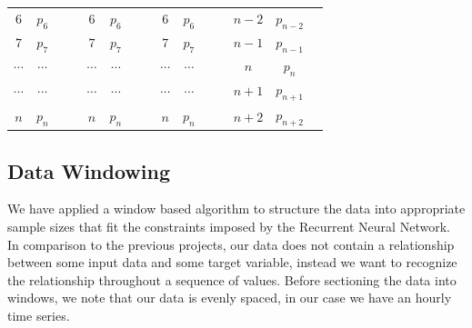 \documentclass
[twocolumn,
secnumarabic,
nobibnotes,
aps,
prl,
reprint,
groupedaddress,
amsmath,
amssymb,
]{revtex4-2}
\begin{document}
\begin{center}
\begin{tabular}{|c|c|cc|c|c|cc|c|c|cc|c|c|c}
    $6$        & $p_6$                         &                &  & $6$        & \cellcolor[HTML]{A2E4F6}$p_6$ &                &  & $6$        & \cellcolor[HTML]{A2E4F6}$p_6$ &       &  & ${n-2}$    & \cellcolor[HTML]{C0C0C0}$p_{n-2}$ &       \\ \cline{1-2} \cline{5-6} \cline{9-10} \cline{13-14}
    $7$        & $p_7$                         &                &  & $7$        & $p_7$                         &                &  & $7$        & \cellcolor[HTML]{A2E4F6}$p_7$ &                &  & ${n-1}$    & \cellcolor[HTML]{C0C0C0}$p_{n-1}$ &                \\ \cline{1-2} \cline{5-6} \cline{9-10} \cline{13-14}
    $\cdots$            & $\cdots$                             &                &  & $\cdots$            & $\cdots$                             &                &  & $\cdots$            & $\cdots$                             &                &  & ${n}$    & \cellcolor[HTML]{C0C0C0}$p_{n}$ &       \\ \cline{1-2} \cline{5-6} \cline{9-10} \cline{13-14}
    $\cdots$            & $\cdots$                             &                &  & $\cdots$            & $\cdots$                             &                &  & $\cdots$            & $\cdots$                             &                &  & ${n+1}$    & \cellcolor[HTML]{A2E4F6}$p_{n+1}$ &  \\ \cline{1-2} \cline{5-6} \cline{9-10} \cline{13-14}
    $n$        & $p_n$                         &                &  & $n$        & $p_n$                         &                &  & $n$        & $p_n$                         &                &  & $n+2$        & \cellcolor[HTML]{A2E4F6}$p_{n+2}$     &                \\ \cline{1-2} \cline{5-6} \cline{9-10} \cline{13-14}
  \end{tabular}
\end{center}

\subsection{Data Windowing}
We have applied a window based algorithm to structure the data into appropriate sample sizes that fit the constraints imposed by the Recurrent Neural Network. In comparison to the previous projects, our data does not contain a relationship between some input data and some target variable, instead we want to recognize the relationship throughout a sequence of values. Before sectioning the data into windows, we note that our data is evenly spaced, in our case we have an hourly time series. 
\end{document}
